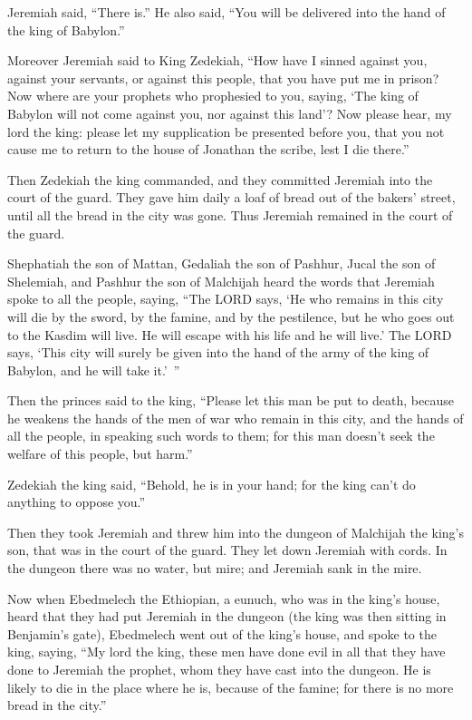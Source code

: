 Jeremiah said, “There is.” He also said, “You will be delivered into the hand of the king of Babylon.”


\myverse{}Moreover Jeremiah said to King Zedekiah, “How have I sinned against you, against your servants, or against this people, that you have put me in prison? \myverse{}Now where are your prophets who prophesied to you, saying, ‘The king of Babylon will not come against you, nor against this land’? \myverse{}Now please hear, my lord the king: please let my supplication be presented before you, that you not cause me to return to the house of Jonathan the scribe, lest I die there.”


\myverse{}Then Zedekiah the king commanded, and they committed Jeremiah into the court of the guard. They gave him daily a loaf of bread out of the bakers’ street, until all the bread in the city was gone. Thus Jeremiah remained in the court of the guard.


\mychapter{} \myverse*{}Shephatiah the son of Mattan, Gedaliah the son of Pashhur, Jucal the son of Shelemiah, and Pashhur the son of Malchijah heard the words that Jeremiah spoke to all the people, saying, \myverse{}“The LORD says, ‘He who remains in this city will die by the sword, by the famine, and by the pestilence, but he who goes out to the Kasdim will live. He will escape with his life and he will live.’ \myverse{}The LORD says, ‘This city will surely be given into the hand of the army of the king of Babylon, and he will take it.’ ”


\myverse{}Then the princes said to the king, “Please let this man be put to death, because he weakens the hands of the men of war who remain in this city, and the hands of all the people, in speaking such words to them; for this man doesn’t seek the welfare of this people, but harm.”

\myverse{}Zedekiah the king said, “Behold, he is in your hand; for the king
can’t do anything to oppose you.”

\myverse{}Then they took Jeremiah and threw him into the dungeon of Malchijah the king’s son, that was in the court of the guard. They let down Jeremiah with cords. In the dungeon there was no water, but mire; and Jeremiah sank in the mire.


\myverse{}Now when Ebedmelech the Ethiopian, a eunuch, who was in the king’s house, heard that they had put Jeremiah in the dungeon (the king was then sitting in Benjamin’s gate), \myverse{}Ebedmelech went out of the king’s house, and spoke to the king, saying, \myverse{}“My lord the king, these men have done evil in all that they have done to Jeremiah the prophet, whom they have cast into the dungeon. He is likely to die in the place where he is, because of the famine; for there is no more bread in the city.”


